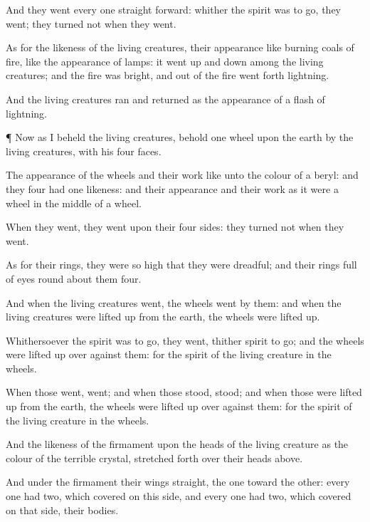 {And they
went every
one
straight
forward: whither the
spirit was to
go, they
went;
{} they
turned not when they
went.

As for the
likeness of the living
creatures, their
appearance
{} like
burning
coals of
fire,
{} like the
appearance of
lamps: it went up and
down among the living
creatures; and the
fire was
bright, and out of the
fire went
forth
lightning.

And the living
creatures
ran and
returned as the
appearance of a flash of
lightning.


\par }{\PP {}¶ Now as I
beheld the living
creatures, behold
one
wheel upon the
earth
by the living
creatures, with his
four
faces.

The
appearance of the
wheels and their
work
{} like unto the
colour of a
beryl: and they
four had
one
likeness: and their
appearance and their
work
{} as it were a
wheel in the
middle of a
wheel.

When they
went, they
went upon their
four
sides:
{} they
turned not when they
went.

As for their
rings, they were so
high that they were
dreadful; and their
rings
{}
full of
eyes round
about them
four.

And when the living
creatures
went, the
wheels
went by
them: and when the living
creatures were lifted
up from the
earth, the
wheels were lifted
up.

Whithersoever the
spirit was to
go, they
went, thither
{}
spirit to
go; and the
wheels were lifted
up over
against them: for the
spirit of the living
creature
{} in the
wheels.

When those
went,
{}
went; and when those
stood,
{}
stood; and when those were lifted
up from the
earth, the
wheels were lifted
up over
against them: for the
spirit of the living
creature
{} in the
wheels.

And the
likeness of the
firmament upon the
heads of the living
creature
{} as the
colour of the
terrible
crystal, stretched
forth over their
heads
above.

And under the
firmament
{} their
wings
straight, the
one toward the
other: every
one had
two, which
covered on this
side, and every
one had
two, which
covered on that
side, their
bodies.

}
